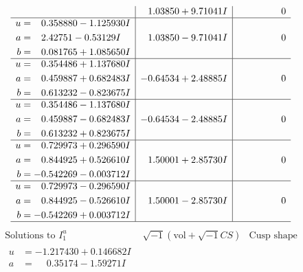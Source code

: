 \documentclass[1p]{elsarticle_modified}
\theoremstyle{definition}
\newcommand{\I}{\sqrt{-1}}
\begin{document}
$$\begin{array}{c|c|c}
 & \phantom{-}1.03850 + 9.71041 I & \phantom{-0.000000 } 0 \\ \hline\begin{aligned}
u &= \phantom{-}0.358880 - 1.125930 I \\
a &= \phantom{-}2.42751 - 0.53129 I \\
b &= \phantom{-}0.081765 + 1.085650 I\end{aligned}
 & \phantom{-}1.03850 - 9.71041 I & \phantom{-0.000000 } 0 \\ \hline\begin{aligned}
u &= \phantom{-}0.354486 + 1.137680 I \\
a &= \phantom{-}0.459887 + 0.682483 I \\
b &= \phantom{-}0.613232 - 0.823675 I\end{aligned}
 & -0.64534 + 2.48885 I & \phantom{-0.000000 } 0 \\ \hline\begin{aligned}
u &= \phantom{-}0.354486 - 1.137680 I \\
a &= \phantom{-}0.459887 - 0.682483 I \\
b &= \phantom{-}0.613232 + 0.823675 I\end{aligned}
 & -0.64534 - 2.48885 I & \phantom{-0.000000 } 0 \\ \hline\begin{aligned}
u &= \phantom{-}0.729973 + 0.296590 I \\
a &= \phantom{-}0.844925 + 0.526610 I \\
b &= -0.542269 - 0.003712 I\end{aligned}
 & \phantom{-}1.50001 + 2.85730 I & \phantom{-0.000000 } 0 \\ \hline\begin{aligned}
u &= \phantom{-}0.729973 - 0.296590 I \\
a &= \phantom{-}0.844925 - 0.526610 I \\
b &= -0.542269 + 0.003712 I\end{aligned}
 & \phantom{-}1.50001 - 2.85730 I & \phantom{-0.000000 } 0\\
 \hline 
 \end{array}$$\newpage$$\begin{array}{c|c|c}  
\text{Solutions to }I^u_{1}& \I (\text{vol} + \sqrt{-1}CS) & \text{Cusp shape}\\
 \hline 
\begin{aligned}
u &= -1.217430 + 0.146682 I \\
a &= \phantom{-}0.35174 - 1.59271 I \\

\end{aligned}
\end{array}$$
\end{document}
